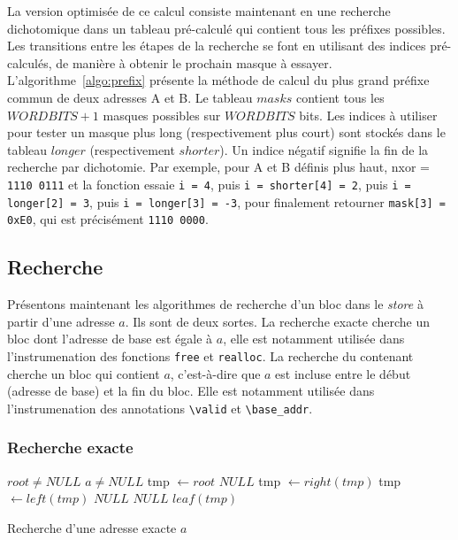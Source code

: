 La version optimisée de ce calcul consiste maintenant en une recherche
dichotomique dans un tableau pré-calculé qui contient tous les préfixes
possibles.
Les transitions entre les étapes de la recherche se font en utilisant des
indices pré-calculés, de manière à obtenir le prochain masque à essayer.
L'algorithme~\ref{algo:prefix} présente la méthode de calcul du plus grand
préfixe commun de deux adresses A et B.
Le tableau $masks$ contient tous les $WORDBITS+1$ masques possibles sur
$WORDBITS$ bits.
Les indices à utiliser pour tester un masque plus long (respectivement plus
court) sont stockés dans le tableau $longer$ (respectivement $shorter$).
Un indice négatif signifie la fin de la recherche par dichotomie.
Par exemple, pour A et B définis plus haut, nxor = \texttt{1110\,0111}
et la fonction essaie \lstinline'i = 4', puis \lstinline'i = shorter[4] = 2',
puis \lstinline'i = longer[2] = 3', puis \lstinline'i = longer[3] = -3', pour
finalement retourner \lstinline'mask[3] = 0xE0', qui
est précisément \texttt{1110\,0000}.


\subsection{Recherche}

Présentons maintenant les algorithmes de recherche d'un bloc dans le
\textit{store} à partir d'une adresse $a$.
Ils sont de deux sortes.
La recherche exacte cherche un bloc dont l'adresse de base est égale à $a$, elle
est notamment utilisée dans l'instrumenation des fonctions \lstinline'free' et
\lstinline'realloc'.
La recherche du contenant cherche un bloc qui contient $a$, c'est-à-dire que
$a$ est incluse entre le début (adresse de base) et la fin du bloc.
Elle est notamment utilisée dans l'instrumenation des annotations
\lstinline'\valid' et \lstinline'\base_addr'.

\subsubsection*{Recherche exacte}

\begin{algorithm}
\begin{algorithmic}
\Require $root \neq NULL$
\Require $a \neq NULL$
\State tmp $\gets root$
    \Return $NULL$
  \EndIf
    \State tmp $\gets right(tmp)$
    \State tmp $\gets left(tmp)$
  \Else
    \Return $NULL$
  \EndIf
\EndWhile
{}
  \Return $NULL$
\Else
  \Return $leaf(tmp)$
\EndIf
\end{algorithmic}
\caption{Recherche d'une adresse exacte $a$
  \label{algo:get-exact}}
\end{algorithm}

